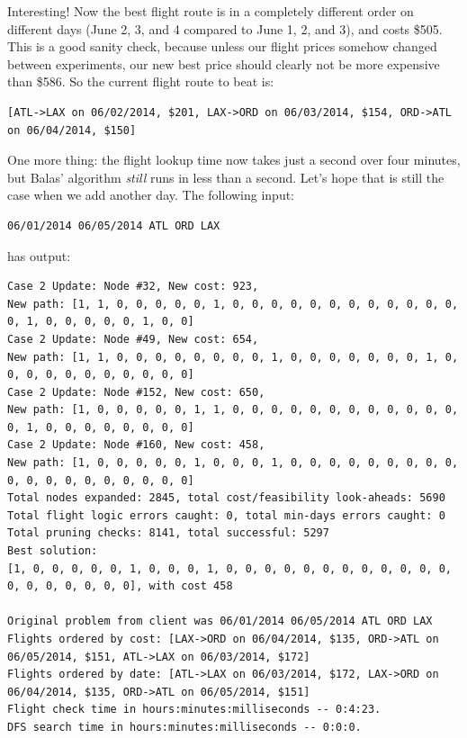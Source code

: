 \documentclass{article}
\begin{document}
Interesting! Now the best flight route is in a completely different order on different days (June 2, 3, and 4 compared to June 1, 2, and 3), and costs
\$505. This is a good sanity check, because unless our flight prices somehow changed between experiments, our new best price should clearly not be
more expensive than \$586. So the current flight route to beat is:

\footnotesize
\begin{verbatim}
[ATL->LAX on 06/02/2014, $201, LAX->ORD on 06/03/2014, $154, ORD->ATL on 06/04/2014, $150]
\end{verbatim}
\normalsize

One more thing: the flight lookup time now takes just a second over four minutes, but Balas' algorithm \emph{still} runs in less than a second. Let's
hope that is still the case when we add another day. The following input:

\begin{verbatim}
06/01/2014 06/05/2014 ATL ORD LAX
\end{verbatim}

has output:

\scriptsize
\begin{verbatim}
Case 2 Update: Node #32, New cost: 923, 
New path: [1, 1, 0, 0, 0, 0, 0, 1, 0, 0, 0, 0, 0, 0, 0, 0, 0, 0, 0, 0, 0, 1, 0, 0, 0, 0, 0, 1, 0, 0]
Case 2 Update: Node #49, New cost: 654, 
New path: [1, 1, 0, 0, 0, 0, 0, 0, 0, 0, 1, 0, 0, 0, 0, 0, 0, 0, 1, 0, 0, 0, 0, 0, 0, 0, 0, 0, 0, 0]
Case 2 Update: Node #152, New cost: 650, 
New path: [1, 0, 0, 0, 0, 0, 1, 1, 0, 0, 0, 0, 0, 0, 0, 0, 0, 0, 0, 0, 0, 1, 0, 0, 0, 0, 0, 0, 0, 0]
Case 2 Update: Node #160, New cost: 458, 
New path: [1, 0, 0, 0, 0, 0, 1, 0, 0, 0, 1, 0, 0, 0, 0, 0, 0, 0, 0, 0, 0, 0, 0, 0, 0, 0, 0, 0, 0, 0]
Total nodes expanded: 2845, total cost/feasibility look-aheads: 5690
Total flight logic errors caught: 0, total min-days errors caught: 0
Total pruning checks: 8141, total successful: 5297
Best solution:
[1, 0, 0, 0, 0, 0, 1, 0, 0, 0, 1, 0, 0, 0, 0, 0, 0, 0, 0, 0, 0, 0, 0, 0, 0, 0, 0, 0, 0, 0], with cost 458

Original problem from client was 06/01/2014 06/05/2014 ATL ORD LAX
Flights ordered by cost: [LAX->ORD on 06/04/2014, $135, ORD->ATL on 06/05/2014, $151, ATL->LAX on 06/03/2014, $172]
Flights ordered by date: [ATL->LAX on 06/03/2014, $172, LAX->ORD on 06/04/2014, $135, ORD->ATL on 06/05/2014, $151]
Flight check time in hours:minutes:milliseconds -- 0:4:23.
DFS search time in hours:minutes:milliseconds -- 0:0:0.
\end{verbatim}
\normalsize
\end{document}
